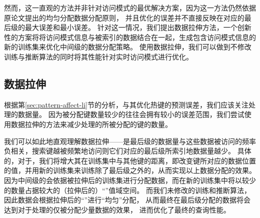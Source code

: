
然而，这一直观的方法并非针对访问模式的最优解决方案，因为这一方法仍然依据原论文提出的均匀分配数据分配原则，
并且优化{\hotkey}的误差并不直接反映在对应的{\rmi}最后级{\model}的最大误差和最小误差。
针对这一情况，我们提出数据拉伸方法，一个创新性的方案将将访问模式信息与被索引的数据结合在一起，生成包含访问模式信息的新的训练集来优化{\rmi}中间级的数据分配策略。
使用数据拉伸，我们可以做到不修改{\rmi}训练与推断算法的同时将其性能针对实时访问模式进行优化。

\subsection{数据拉伸}

根据第\ref{sec:pattern-affect-li}节的分析，与其优化热键的预测误差，我们应该关注处理{\hotkey}{\model}的数据量。
因为被分配键数量较少的{\model}往往会拥有较小的误差范围，我们尝试使用数据拉伸的方法来减少处理{\hotkey}的{\model}所被分配的键的数量。

我们可以如此地直观理解数据拉伸{------}是{\rmi}最后级{\model}的数据量与这些数据被访问的频率负相关，搜索键越被频繁地访问则它们对应的{\rmi}最后级{\model}所索引地数据量越少。
具体的，对于{\hotkey}，我们将增大其在训练集中与其他键的距离，即改变键所对应的数据位置的值，并用新的训练集来训练除了最后级之外的{\model}，从而实现以上数据分配的效果。
因为中间级的{\model}会依据被拉伸后的训练集进行分配数据，而在新的训练集中{\hotkey}将以较少的数量占据较大的（拉伸后的）``{\cdf}''值域空间。
而我们未修改{\rmi}的训练和推断算法，因此数据会根据拉伸后的``{\cdf}''进行``均匀''分配，
从而最终在最后级分配的数据将会达到对于处理{\hotkey}的{\model}仅被分配少量数据的效果，
进而优化了最终{\hotkey}的查询性能。

